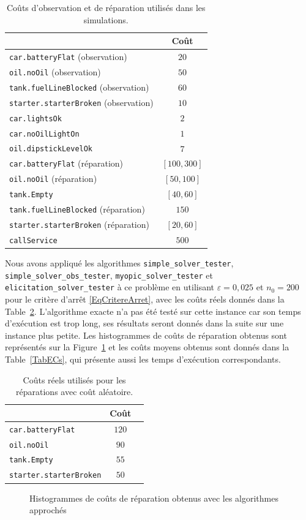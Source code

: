 \documentclass[a4paper,11pt]{article}
\theoremstyle{plain}
\theoremstyle{definition}
\begin{document}
\begin{table}[ht]
\centering
\caption{Coûts d'observation et de réparation utilisés dans les simulations.}
\label{TabCosts}
\begin{tabular}{lc}
\toprule
 & Coût \tabularnewline
\midrule
\texttt{car.batteryFlat} (observation) & $20$ \tabularnewline
\texttt{oil.noOil} (observation) & $50$ \tabularnewline
\texttt{tank.fuelLineBlocked} (observation) & $60$ \tabularnewline
\texttt{starter.starterBroken} (observation) & $10$ \tabularnewline
\texttt{car.lightsOk} & $2$ \tabularnewline
\texttt{car.noOilLightOn} & $1$ \tabularnewline
\texttt{oil.dipstickLevelOk} & $7$ \tabularnewline
\texttt{car.batteryFlat} (réparation) & $[100, 300]$ \tabularnewline
\texttt{oil.noOil} (réparation) & $[50, 100]$ \tabularnewline
\texttt{tank.Empty} & $[40, 60]$ \tabularnewline
\texttt{tank.fuelLineBlocked} (réparation) & $150$ \tabularnewline
\texttt{starter.starterBroken} (réparation) & $[20, 60]$ \tabularnewline
\texttt{callService} & $500$ \tabularnewline
\bottomrule
\end{tabular}
\end{table}

Nous avons appliqué les algorithmes \texttt{simple\_solver\_tester}, \texttt{simple\_solver\_obs\_tester}, \texttt{myopic\_solver\_tester} et \texttt{elicitation\_solver\_tester} à ce problème en utilisant $\varepsilon = 0,025$ et $n_0 = 200$ pour le critère d'arrêt \eqref{EqCritereArret}, avec les coûts réels donnés dans la Table~\ref{TabCoutsReels}. L'algorithme exacte n'a pas été testé sur cette instance car son temps d'exécution est trop long, ses résultats seront donnés dans la suite sur une instance plus petite. Les histogrammes de coûts de réparation obtenus sont représentés sur la Figure~\ref{FigHistogrammes} et les coûts moyens obtenus sont donnés dans la Table~\ref{TabECs}, qui présente aussi les temps d'exécution correspondants.

\begin{table}[ht]
\centering
\caption{Coûts réels utilisés pour les réparations avec coût aléatoire.}
\label{TabCoutsReels}
\begin{tabular}{lcr}
\toprule
 & Coût \tabularnewline
\midrule
\texttt{car.batteryFlat} & $120$ \tabularnewline
\texttt{oil.noOil} & $90$ \tabularnewline
\texttt{tank.Empty} & $55$ \tabularnewline
\texttt{starter.starterBroken} & $50$ \tabularnewline
\bottomrule
\end{tabular}
\end{table}

\begin{figure}[ht]
\centering
\resizebox{\textwidth}{!}{}
\caption{Histogrammes de coûts de réparation obtenus avec les algorithmes approchés}
\label{FigHistogrammes}
\end{figure}
\end{document}
